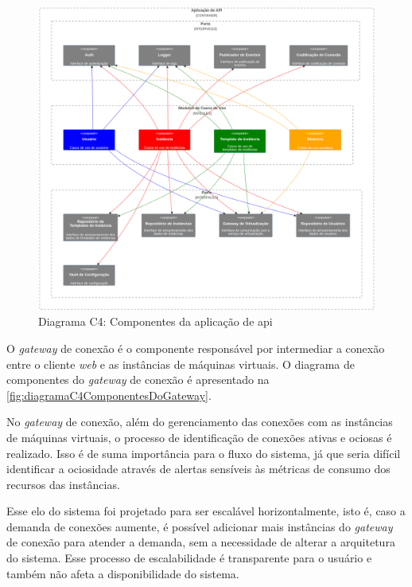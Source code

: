 \begin{figure}[H]
\caption{Diagrama C4: Componentes da aplicação de \gls{api}}
\label{fig:diagramaC4ComponentesDaAPI}
\includegraphics[width=\textwidth]{capitulos/2-metodologia/files/c4-component-api.png}
\end{figure}

O \textit{gateway} de conexão é o componente responsável por intermediar a conexão entre o cliente \textit{web} e as instâncias de máquinas virtuais. O diagrama de componentes do \textit{gateway} de conexão é apresentado na \autoref{fig:diagramaC4ComponentesDoGateway}.

No \textit{gateway} de conexão, além do gerenciamento das conexões com as instâncias de máquinas virtuais, o processo de identificação de conexões ativas e ociosas é realizado. Isso é de suma importância para o fluxo do sistema, já que seria difícil identificar a ociosidade através de alertas sensíveis às métricas de consumo dos recursos das instâncias.

Esse elo do sistema foi projetado para ser escalável horizontalmente, isto é, caso a demanda de conexões aumente, é possível adicionar mais instâncias do \textit{gateway} de conexão para atender a demanda, sem a necessidade de alterar a arquitetura do sistema. Esse processo de escalabilidade é transparente para o usuário e também não afeta a disponibilidade do sistema.

